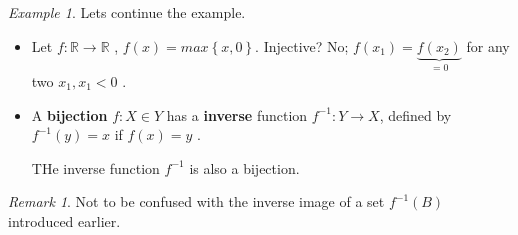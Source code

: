 \documentclass{article}
\theoremstyle{remark}
\newtheorem*{remark}{Remark}
\newtheorem{example}{Example}
\begin{document}
\begin{example}
  Lets continue the example.
  \begin{itemize}
    \item
  Let $f: \mathbb{R} \to \mathbb{R} $ , $f\left( x \right) = max \left\{ x,0 \right\}$. Injective? No; $f\left( x_{1} \right) = \underbrace{f\left( x_{2} \right)}_\text{$= 0$}  $ for any two $x_{1}, x_{1} < 0$ .
\item  A \textbf{bijection}  $f:  X \in Y$ has a \textbf{inverse}  function $f^{-1} : Y \to X$, defined by $f^{-1} \left( y \right) = x$ if $f\left( x \right) = y$ . \par
  THe inverse function $f^{-1} $ is also a bijection. 
  \end{itemize}
\end{example}
\begin{remark}
  Not to be confused with the inverse image of a set $f^{-1} \left( B \right) $ introduced earlier.
\end{remark}




\end{document}

